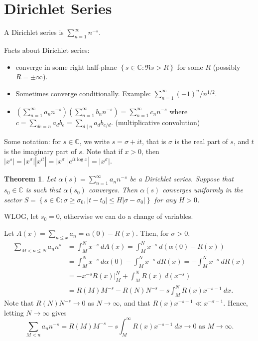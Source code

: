 \documentclass[11pt]{article}
\newtheorem{thm}{Theorem}[section]
\theoremstyle{definition}
\newcommand{\set}[1]{\left\{ #1 \right\}}
\newcommand{\abs}[1]{\left\lvert#1\right\rvert} %
\newcommand{\CC}{\mathbb{C}}
\begin{document}

\section{Dirichlet Series}

A Dirichlet series is $\sum_{n=1}^\infty n^{-s}$.

Facts about Dirichlet series:
\begin{itemize}
\item converge in some right half-plane $\set{s\in\CC:\Re s>R}$ for some $R$ (possibly
$R=\pm\infty$).
\item Sometimes converge conditionally. Example: $\sum_{n=1}^\infty(-1)^n/n^{1/2}$.
\item $\left(\sum_{n=1}^\infty a_nn^{-s}\right)\left(\sum_{n=1}^\infty b_nn^{-s}\right)
= \sum_{n=1}^\infty c_nn^{-s}$ where $c=\sum_{de=n}a_db_e=\sum_{d\mid n}a_db_{e/d}$.
(multiplicative convolution)
\end{itemize}

Some notation: for $s\in\CC$, we write $s=\sigma+it$, that is $\sigma$ is the real part of
$s$, and $t$ is the imaginary part of $s$. Note that if $x>0$, then
$\abs{x^s}=\abs{x^\sigma}\abs{x^{it}}=\abs{x^\sigma}\abs{e^{it\log{x}}}=\abs{x^\sigma}$.

\begin{thm}
Let $\alpha(s)=\sum_{n=1}^\infty a_nn^{-s}$ be a Dirichlet series. Suppose that
$s_0\in\CC$ is such that $\alpha(s_0)$ converges. Then $\alpha(s)$ converges uniformly in
the sector $S=\set{s\in\CC:\sigma\ge\sigma_0,\abs{t-t_0}\le H\abs{\sigma-\sigma_0}}$ for
any $H>0$.
\end{thm}

\proof
WLOG, let $s_0=0$, otherwise we can do a change of variables.

Let $A(x)=\sum_{n\le x}a_n=\alpha(0)-R(x)$. Then, for $\sigma>0$,
\begin{align*}
\sum_{M<n\le N}a_n n^s &= \int_M^N x^{-s} ~dA(x) = \int_M^N x^{-s} ~d(\alpha(0)-R(x)) \\
&= \int_M^N x^{-s} ~d\alpha(0) - \int_M^N x^{-s} ~dR(x) = -\int_M^N x^{-s} ~dR(x) \\
&= \left.-x^{-s}R(x)\right|_M^N + \int_M^N R(x) ~d(x^{-s}) \\
&= R(M)M^{-s} - R(N)N^{-s} - s\int_M^N R(x)x^{-s-1} ~dx .
\end{align*}
Note that $R(N)N^{-s}\to0$ as $N\to\infty$, and that $R(x)x^{-s-1}\ll x^{-\sigma-1}$.
Hence, letting $N\to\infty$ gives
\[
  \sum_{M<n}a_nn^{-s} = R(M)M^{-s} - s\int_M^\infty R(x)x^{-s-1} ~dx
  \to 0 \text{ as } M \to \infty .
\]
\end{document}
